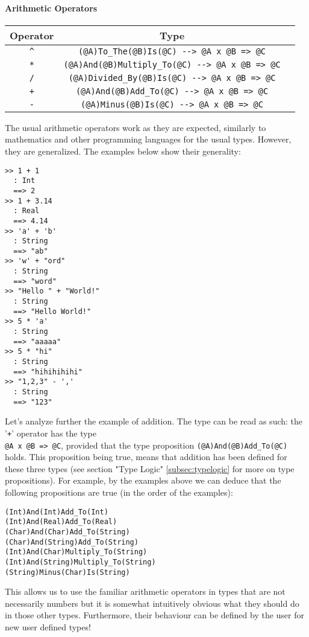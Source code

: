 \documentclass{article}
\begin{document}
\paragraph{Arithmetic Operators}
\begin{center}
\begin{tabular}{ |c|c|c| } 
\hline
Operator & Type
\\ 
\hline
\hline
\verb|^| & \verb|(@A)To_The(@B)Is(@C) --> @A x @B => @C|
\\
\hline
\verb|*| & \verb|(@A)And(@B)Multiply_To(@C) --> @A x @B => @C|
\\
\hline
\verb|/| & \verb|(@A)Divided_By(@B)Is(@C) --> @A x @B => @C|
\\
\hline
\verb|+| & \verb|(@A)And(@B)Add_To(@C) --> @A x @B => @C|
\\ 
\hline
\verb|-| & \verb|(@A)Minus(@B)Is(@C) --> @A x @B => @C|
\\
\hline
\end{tabular}
\end{center}
The usual arithmetic operators work as they are expected, similarly to
mathematics and other programming languages for the usual types. However, they
are generalized. The examples below show their generality:
\begin{verbatim}
>> 1 + 1
  : Int
  ==> 2
>> 1 + 3.14
  : Real
  ==> 4.14
>> 'a' + 'b'
  : String
  ==> "ab"
>> 'w' + "ord"
  : String
  ==> "word"
>> "Hello " + "World!"
  : String
  ==> "Hello World!"
>> 5 * 'a'
  : String
  ==> "aaaaa"
>> 5 * "hi"
  : String
  ==> "hihihihihi"
>> "1,2,3" - ','
  : String
  ==> "123"
\end{verbatim}
Let's analyze further the example of addition. The type can be read as such:
the '\verb|+|' operator has the type \\ \verb|@A x @B => @C|, provided that the
type proposition \verb|(@A)And(@B)Add_To(@C)| holds. This proposition being
true, means that addition has been defined for these three types (see section
"Type Logic" \ref{subsec:typelogic} for more on type propositions). For
example, by the examples above we can deduce that the following propositions
are true (in the order of the examples):
\begin{verbatim}
(Int)And(Int)Add_To(Int)
(Int)And(Real)Add_To(Real)
(Char)And(Char)Add_To(String)
(Char)And(String)Add_To(String)
(Int)And(Char)Multiply_To(String)
(Int)And(String)Multiply_To(String)
(String)Minus(Char)Is(String)
\end{verbatim}
This allows us to use the familiar arithmetic operators in types that are not
necessarily numbers but it is somewhat intuitively obvious what they should do
in those other types. Furthermore, their behaviour can be defined by the user
for new user defined types!
\end{document}
